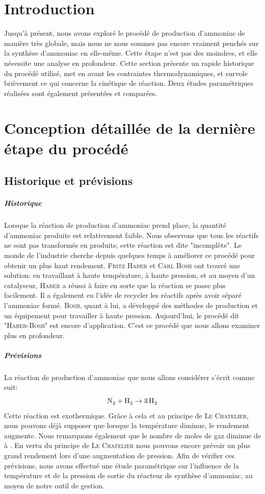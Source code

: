 \chapter{Introduction}
Jusqu'à présent, nous avons exploré le procédé de production d'ammoniac de manière très globale, mais nous ne nous
sommes pas encore vraiment penchés sur la synthèse d'ammoniac en elle-même. Cette étape n'est pas des moindres, et
elle nécessite une analyse en profondeur. Cette section présente un rapide historique du procédé utilisé, met en
avant les contraintes thermodynamiques, et survole brièvement ce qui concerne la cinétique de réaction. Deux études
paramétriques réalisées sont également présentées et comparées.

\chapter{Conception détaillée de la dernière étape du procédé}
\section{Historique et prévisions}

\paragraph{Historique}
Lorsque la réaction de production d'ammoniac prend place, la quantité d'ammoniac produite est relativement faible.
Nous observons que tous les réactifs ne sont pas transformés en produits; cette réaction est dite "incomplète".
Le monde de l'industrie cherche depuis quelques temps à améliorer ce procédé pour obtenir un plus haut rendement.
\textsc{Fritz Haber} et \textsc{Carl Bosh} ont trouvé une solution: en travaillant à haute température, à haute pression, et au moyen
d'un catalyseur, \textsc{Haber} a réussi à faire en sorte que la réaction se passe plus facilement. Il a également eu l'idée
de recycler les réactifs après avoir séparé l'ammoniac formé. \textsc{Bosh}, quant à lui, a développé des méthodes de
production et un équipement pour travailler à haute pression. Aujourd'hui, le procédé dit "\textsc{Haber-Bosh}" est encore
d'application. C'est ce procédé que nous allons examiner plus en profondeur.

\paragraph{Prévisions}
La réaction de production d'ammoniac que nous allons considérer s'écrit comme suit:
$$\ce{N2} + \ce{H2} \rightarrow \ce{3H2}$$
Cette réaction est exothermique. Grâce à cela et au principe de \textsc{Le Chatelier}, nous pouvons déjà supposer que lorsque
la température diminue, le rendement augmente. Nous remarquons également que le nombre de moles de gaz diminue de  à
. En vertu du principe de \textsc{Le Chatelier} nous pouvons encore prévoir un plus grand rendement lors d'une augmentation de
pression. Afin de vérifier ces prévisions, nous avons effectué une étude paramétrique sur l'influence de la température et de la
pression de sortie du réacteur de synthèse d'ammoniac, au moyen de notre outil de gestion.

